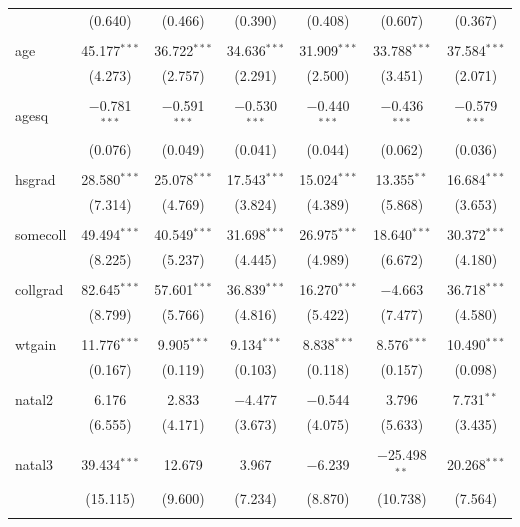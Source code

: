 \documentclass[]{book}
\begin{document}
\begin{table}[!htbp]
\begin{tabular}{@{\extracolsep{5pt}}lcccccc}
  & (0.640) & (0.466) & (0.390) & (0.408) & (0.607) & (0.367) \\ 
  & & & & & & \\ 
 age & 45.177$^{***}$ & 36.722$^{***}$ & 34.636$^{***}$ & 31.909$^{***}$ & 33.788$^{***}$ & 37.584$^{***}$ \\ 
  & (4.273) & (2.757) & (2.291) & (2.500) & (3.451) & (2.071) \\ 
  & & & & & & \\ 
 agesq & $-$0.781$^{***}$ & $-$0.591$^{***}$ & $-$0.530$^{***}$ & $-$0.440$^{***}$ & $-$0.436$^{***}$ & $-$0.579$^{***}$ \\ 
  & (0.076) & (0.049) & (0.041) & (0.044) & (0.062) & (0.036) \\ 
  & & & & & & \\ 
 hsgrad & 28.580$^{***}$ & 25.078$^{***}$ & 17.543$^{***}$ & 15.024$^{***}$ & 13.355$^{**}$ & 16.684$^{***}$ \\ 
  & (7.314) & (4.769) & (3.824) & (4.389) & (5.868) & (3.653) \\ 
  & & & & & & \\ 
 somecoll & 49.494$^{***}$ & 40.549$^{***}$ & 31.698$^{***}$ & 26.975$^{***}$ & 18.640$^{***}$ & 30.372$^{***}$ \\ 
  & (8.225) & (5.237) & (4.445) & (4.989) & (6.672) & (4.180) \\ 
  & & & & & & \\ 
 collgrad & 82.645$^{***}$ & 57.601$^{***}$ & 36.839$^{***}$ & 16.270$^{***}$ & $-$4.663 & 36.718$^{***}$ \\ 
  & (8.799) & (5.766) & (4.816) & (5.422) & (7.477) & (4.580) \\ 
  & & & & & & \\ 
 wtgain & 11.776$^{***}$ & 9.905$^{***}$ & 9.134$^{***}$ & 8.838$^{***}$ & 8.576$^{***}$ & 10.490$^{***}$ \\ 
  & (0.167) & (0.119) & (0.103) & (0.118) & (0.157) & (0.098) \\ 
  & & & & & & \\ 
 natal2 & 6.176 & 2.833 & $-$4.477 & $-$0.544 & 3.796 & 7.731$^{**}$ \\ 
  & (6.555) & (4.171) & (3.673) & (4.075) & (5.633) & (3.435) \\ 
  & & & & & & \\ 
 natal3 & 39.434$^{***}$ & 12.679 & 3.967 & $-$6.239 & $-$25.498$^{**}$ & 20.268$^{***}$ \\ 
  & (15.115) & (9.600) & (7.234) & (8.870) & (10.738) & (7.564) \\ 
  & & & & & & \\ 

\end{tabular}
\end{table}
\end{document}
